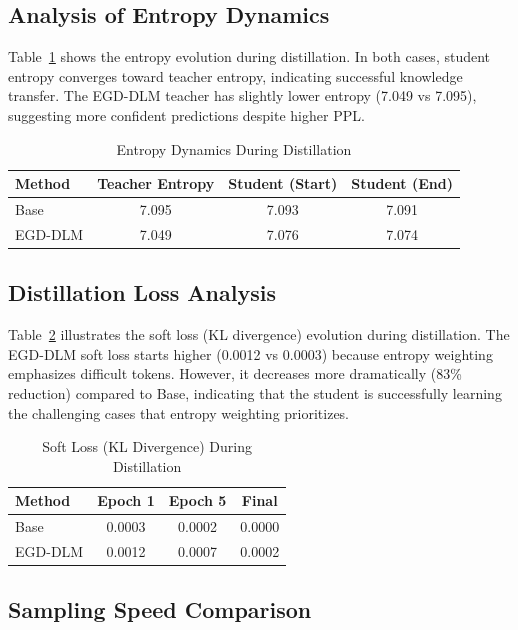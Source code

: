 \documentclass[conference]{IEEEtran}
\begin{document}
\subsection{Analysis of Entropy Dynamics}

Table~\ref{tab:entropy_dynamics} shows the entropy evolution during distillation. In both cases, student entropy converges toward teacher entropy, indicating successful knowledge transfer. The EGD-DLM teacher has slightly lower entropy (7.049 vs 7.095), suggesting more confident predictions despite higher PPL.

\begin{table}[t]
\centering
\caption{Entropy Dynamics During Distillation}
\label{tab:entropy_dynamics}
\begin{tabular}{lccc}
\toprule
\textbf{Method} & \textbf{Teacher Entropy} & \textbf{Student (Start)} & \textbf{Student (End)} \\
\midrule
Base & 7.095 & 7.093 & 7.091 \\
EGD-DLM & 7.049 & 7.076 & 7.074 \\
\bottomrule
\end{tabular}
\end{table}

\subsection{Distillation Loss Analysis}

Table~\ref{tab:soft_loss} illustrates the soft loss (KL divergence) evolution during distillation. The EGD-DLM soft loss starts higher (0.0012 vs 0.0003) because entropy weighting emphasizes difficult tokens. However, it decreases more dramatically (83\% reduction) compared to Base, indicating that the student is successfully learning the challenging cases that entropy weighting prioritizes.

\begin{table}[t]
\centering
\caption{Soft Loss (KL Divergence) During Distillation}
\label{tab:soft_loss}
\begin{tabular}{lccc}
\toprule
\textbf{Method} & \textbf{Epoch 1} & \textbf{Epoch 5} & \textbf{Final} \\
\midrule
Base & 0.0003 & 0.0002 & 0.0000 \\
EGD-DLM & 0.0012 & 0.0007 & 0.0002 \\
\bottomrule
\end{tabular}
\end{table}

\subsection{Sampling Speed Comparison}
\end{document}
